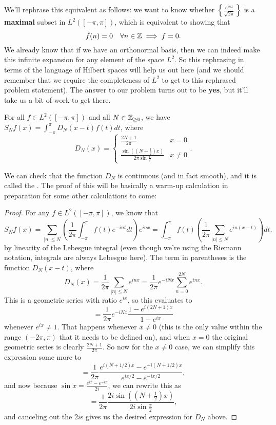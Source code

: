We'll rephrase this equivalent as follows: we want to know whether $\left\{\frac{e^{inx}}{\sqrt{2\pi}}\right\}$ is a \textbf{maximal} subset in $L^2([-\pi, \pi])$, which is equivalent to showing that 
\[
    \hat{f}(n) = 0 \quad \forall n \in \mathbb Z \implies f = 0.
\]
We already know that if we have an orthonormal basis, then we can indeed make this infinite expansion for any element of the space $L^2$. So this rephrasing in terms of the language of Hilbert spaces will help us out here (and we should remember that we require the completeness of $L^2$ to get to this rephrased problem statement). The answer to our problem turns out to be \textbf{yes}, but it'll take us a bit of work to get there.

\begin{proposition}
For all $f \in L^2([-\pi, \pi])$ and all $N \in \mathbb Z_{\ge 0}$, we have $S_Nf(x) = \int_{-\pi}^{\pi} D_N(x-t) f(t) dt$, 
where
\[
    D_N(x) = \begin{cases} \frac{2N+1}{2\pi} & x = 0 \\ \frac{\sin\left(\left(N + \frac{1}{2}\right)x\right)}{2\pi \sin \frac{x}{2}} & x \ne 0 \end{cases}.
\]
\end{proposition}

We can check that the function $D_N$ is continuous (and in fact smooth), and it is called the . The proof of this will be basically a warm-up calculation in preparation for some other calculations to come:

\begin{proof}
For any $f \in L^2([-\pi, \pi])$, we know that 
\[
    S_N f(x) = \sum_{|n| \le N} \left(\frac{1}{2\pi} \int_{-\pi}^{\pi} f(t) e^{-int} dt\right) e^{inx} = \int_{-\pi}^\pi f(t) \left(\frac{1}{2\pi} \sum_{|n| \le N} e^{in(x-t)}\right) dt.
\]
by linearity of the Lebesgue integral (even though we're using the Riemann notation, integrals are always Lebesgue here). The term in parentheses is the function $D_N(x-t)$, where 
\[
    D_N(x) = \frac{1}{2\pi} \sum_{|n| \le N} e^{inx} = \frac{1}{2\pi} e^{-iNx} \sum_{n = 0}^{2N} e^{inx}.
\]
This is a geometric series with ratio $e^{ix}$, so this evaluates to 
\[
    = \frac{1}{2\pi} e^{-iNx} \frac{1 - e^{i(2N+1)x}}{1-e^{ix}}
\]
whenever $e^{ix} \ne 1$. That happens whenever $x \ne 0$ (this is the only value within the range $(-2\pi, \pi)$ that it needs to be defined on), and when $x = 0$ the original geometric series is clearly $\frac{2N+1}{2\pi}$. So now for the $x \ne 0$ case, we can simplify this expression some more to
\[
    = \frac{1}{2\pi} \frac{e^{i(N + 1/2)x} - e^{-i(N + 1/2)x}}{e^{ix/2}-e^{-ix/2}},
\]
and now because $\sin x = \frac{e^{ix} - e^{-ix}}{2i}$, we can rewrite this as
\[
    = \frac{1}{2\pi} \frac{2i \sin\left(\left(N + \frac{1}{2}\right) x\right)}{2i \sin \frac{x}{2}},
\]
and canceling out the $2i$s gives us the desired expression for $D_N$ above.
\end{proof}

